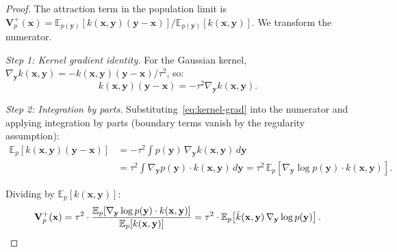 \documentclass[10pt,a4paper]{amsart}
\newcommand{\E}{\mathbb{E}}
\newcommand{\bV}{\mathbf{V}}
\newcommand{\bx}{\mathbf{x}}
\newcommand{\by}{\mathbf{y}}
\newcommand{\kbar}{\bar{k}}
\begin{document}
\begin{proof}
The attraction term in the population limit is
$\bV_p^+(\bx) = {\E_{p(\by)}[k(\bx,\by)(\by - \bx)]}/{\E_{p(\by)}[k(\bx,\by)]}$.
We transform the numerator.

\textit{Step 1: Kernel gradient identity.}
For the Gaussian kernel, $\nabla_\by k(\bx,\by) = -k(\bx,\by)(\by - \bx)/\tau^2$, so:
\begin{equation}
    k(\bx,\by)(\by - \bx) = -\tau^2 \nabla_\by k(\bx,\by).
    \label{eq:kernel-grad}
\end{equation}

\textit{Step 2: Integration by parts.}
Substituting~\eqref{eq:kernel-grad} into the numerator and applying integration by parts (boundary terms vanish by the regularity assumption):
\begin{align}
    \E_p[k(\bx,\by)(\by - \bx)]
    &= -\tau^2\int p(\by)\,\nabla_\by k(\bx,\by)\,d\by \nonumber \\
    &= \tau^2\int \nabla_\by p(\by) \cdot k(\bx,\by)\,d\by
    = \tau^2\,\E_p\!\left[\nabla_\by \log p(\by) \cdot k(\bx,\by)\right].
    \label{eq:ibp}
\end{align}

Dividing by $\E_p[k(\bx,\by)]$:
\begin{equation}
    \bV_p^+(\bx) = \tau^2 \cdot \frac{\E_p[\nabla_\by \log p(\by) \cdot k(\bx,\by)]}{\E_p[k(\bx,\by)]} = \tau^2 \cdot \E_p\!\left[\kbar(\bx,\by)\,\nabla_\by \log p(\by)\right]. \qedhere
\end{equation}
\end{proof}
\end{document}
